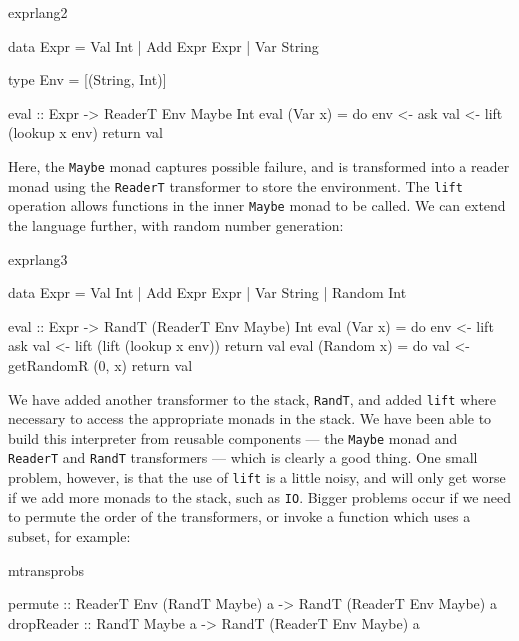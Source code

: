 \begin{SaveVerbatim}{exprlang2}

data Expr = Val Int | Add Expr Expr | Var String

type Env = [(String, Int)]

eval :: Expr -> ReaderT Env Maybe Int
eval (Var x) = do env <- ask
                  val <- lift (lookup x env)
                  return val

\end{SaveVerbatim}

\noindent
Here, the \texttt{Maybe} monad captures possible failure, and is transformed
into a reader monad using the \texttt{ReaderT} transformer to store the
environment. The \texttt{lift} operation allows functions in the inner
\texttt{Maybe} monad to be called.  
We can extend the language further, with random number generation:

\begin{SaveVerbatim}{exprlang3}

data Expr = Val Int | Add Expr Expr | Var String
          | Random Int

eval :: Expr -> RandT (ReaderT Env Maybe) Int
eval (Var x) = do env <- lift ask
                  val <- lift (lift (lookup x env))
                  return val
eval (Random x) = do val <- getRandomR (0, x)
                     return val

\end{SaveVerbatim}

\noindent
We have added another transformer to the stack, \texttt{RandT}, and added
\texttt{lift} where necessary to access the appropriate monads in the stack.
We have been able to build this interpreter from reusable components --- the
\texttt{Maybe} monad and \texttt{ReaderT} and \texttt{RandT} transformers ---
which is clearly a good thing. One small problem, however, is that the use of
\texttt{lift} is a little noisy, and will only get worse if we add more
monads to the stack, such as \texttt{IO}. Bigger problems occur if we need
to permute the order of the transformers, or invoke a function which uses a
subset, for example:

\begin{SaveVerbatim}{mtransprobs}

permute :: ReaderT Env (RandT Maybe) a -> 
           RandT (ReaderT Env Maybe) a
dropReader :: RandT Maybe a -> 
              RandT (ReaderT Env Maybe) a

\end{SaveVerbatim}

